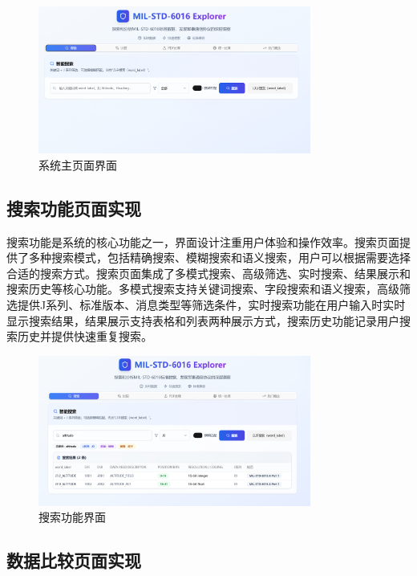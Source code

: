 \begin{figure}[H]
\centering
\includegraphics[width=0.8\textwidth]{chapters/fig-0/front-homepage.png}
\caption{系统主页面界面}
\label{fig:frontend-homepage}
\end{figure}

\subsection{搜索功能页面实现}

搜索功能是系统的核心功能之一，界面设计注重用户体验和操作效率。搜索页面提供了多种搜索模式，包括精确搜索、模糊搜索和语义搜索，用户可以根据需要选择合适的搜索方式。搜索页面集成了多模式搜索、高级筛选、实时搜索、结果展示和搜索历史等核心功能。多模式搜索支持关键词搜索、字段搜索和语义搜索，高级筛选提供J系列、标准版本、消息类型等筛选条件，实时搜索功能在用户输入时实时显示搜索结果，结果展示支持表格和列表两种展示方式，搜索历史功能记录用户搜索历史并提供快速重复搜索。

\begin{figure}[H]
\centering
\includegraphics[width=0.8\textwidth]{chapters/fig-0/front-search.png}
\caption{搜索功能界面}
\label{fig:frontend-search}
\end{figure}

\subsection{数据比较页面实现}

